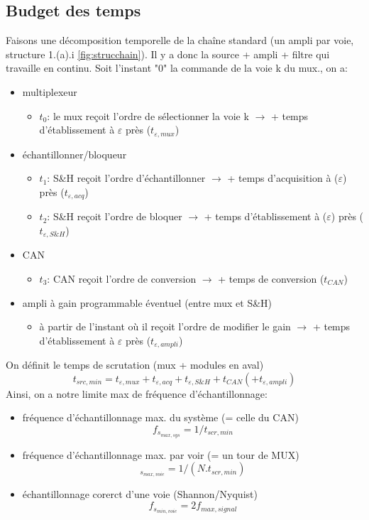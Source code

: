 \subsection{Budget des temps}
Faisons une décomposition temporelle de la chaîne standard (un ampli par voie, structure 1.(a).i \autoref{fig:strucchain}). Il y a donc la source + ampli + filtre qui travaille en continu. Soit l'instant "0" la commande de la voie k du mux., on a:
\begin{itemize}
	\item multiplexeur
	\begin{itemize}
		\item \(t_0\): le mux reçoit l'ordre de sélectionner la voie k \(\rightarrow\) + temps d'établissement à \(\varepsilon\) près (\(t_{\varepsilon,mux}\))
	\end{itemize}
	\item échantillonner/bloqueur
	\begin{itemize}
		\item \(t_1\): S\&H reçoit l'ordre d'échantillonner \(\rightarrow\) + temps d'acquisition à (\(\varepsilon\)) près (\(t_{\varepsilon,acq}\))
		\item \(t_2\): S\&H reçoit l'ordre de bloquer \(\rightarrow\) + temps d'établissement à (\(\varepsilon\)) près (\(t_{\varepsilon,S\&H}\))
	\end{itemize}
	\item CAN
	\begin{itemize}
		\item \(t_3\): CAN reçoit l'ordre de conversion \(\rightarrow\) + temps de conversion (\(t_{CAN}\))
	\end{itemize}
	\item ampli à gain programmable éventuel (entre mux et S\&H)
	\begin{itemize}
		\item à partir de l'instant où il reçoit l'ordre de modifier le gain \(\rightarrow\) + temps d'établissement à \(\varepsilon\) près (\(t_{\varepsilon,ampli}\))
	\end{itemize}
\end{itemize}
On définit le temps de scrutation (mux + modules en aval)
\[t_{src,min} = t_{\varepsilon,mux}+t_{\varepsilon,acq}+t_{\varepsilon,S\&H}+t_{CAN}(+t_{\varepsilon,ampli})\]
Ainsi, on a notre limite max de fréquence d'échantillonnage:
\begin{itemize}
	\item fréquence d'échantillonnage max. du système (= celle du CAN)
	\[f_{s_{max,sys}}=1/t_{scr,min}\]
	\item fréquence d'échantillonnage max. par voir (= un tour de MUX)
	\[_{s_{max,voie}}=1/(N.t_{scr,min})\]
	\item échantillonnage corerct d'une voie (Shannon/Nyquist)
	\[f_{s_{min,voie}}=2f_{max,signal}\]
\end{itemize}

